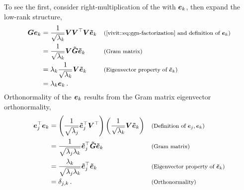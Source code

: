 To see the first, consider right-multiplication of the \ggn with ${\bm{e}}_k$, then
expand the low-rank structure,
\begin{align*}
  \mG \ve_k
  &=
    \frac{1}{\sqrt{\lambda_k}}
    \mV \mV^\top  \mV \vetilde_k
    \explainmath{(\Cref{vivit::eq:ggn-factorization} and definition of $\ve_k$)}
  \\
  &=
    \frac{1}{\sqrt{\lambda_k}}
    \mV \mGtilde \vetilde_k
    \explainmath{(Gram matrix)}
  \\
  &=
    \lambda_k\frac{1}{\sqrt{\lambda_k}}
    \mV \vetilde_k
    \explainmath{(Eigenvector property of $\vetilde_k$)}
  \\
  &= \lambda_k \ve_k\,.
\end{align*}
Orthonormality of the ${\bm{e}}_k$ results from the Gram matrix eigenvector
orthonormality,
\begin{align*}
  {\bm{e}}_j^\top {\bm{e}}_{k}
  &=
    \left(
    \frac{1}{\sqrt{\lambda_j}} \bm{\tilde{e}}_j^\top {\bm{V}} ^\top
    \right)
    \left(
    \frac{1}{\sqrt{\lambda_k}} {\bm{V}} \bm{\tilde{e}}_k
    \right)
    &&{\footnotesize\text{(Definition of ${\bm{e}}_j, {\bm{e}}_k$)}}
  \\
  &=
    \frac{1}{\sqrt{\lambda_j\lambda_k}} \bm{\tilde{e}}_j^\top \bm{\tilde{{\bm{G}}}} \bm{\tilde{e}}_k
    &&{\footnotesize\text{(Gram matrix)}}
  \\
  &=
    \frac{\lambda_k}{\sqrt{\lambda_j\lambda_k}} \bm{\tilde{e}}_j^\top \bm{\tilde{e}}_k
    &&{\footnotesize\text{(Eigenvector property of $\bm{\tilde{e}}_k$)}}
  \\
  &=
    \delta_{j,k}\,.
    &&{\footnotesize\text{(Orthonormality)}}
\end{align*}

